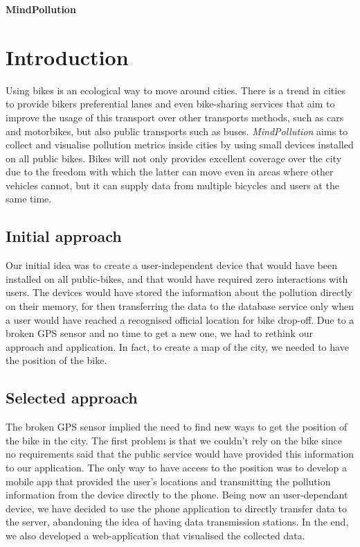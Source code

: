 \documentclass[12pt]{article}
\begin{document}
  \begin{center}
    \LARGE{\textbf{MindPollution}}
  \end{center}
  \section{Introduction}
  Using bikes is an ecological way to move around cities. 
  There is a trend in cities to provide bikers preferential lanes and even bike-sharing services that aim to improve the usage of this transport over other transports methods, such as cars and motorbikes, but also public transports such as buses. 
  \emph{MindPollution} aims to collect and visualise pollution metrics inside cities by using small devices installed on all public bikes. Bikes will not only provides excellent coverage over the city due to the freedom with which the latter can move even in areas where other vehicles cannot, but it can supply data from multiple bicycles and users at the same time.

  \subsection{Initial approach}
  Our initial idea was to create a user-independent device that would have been installed on all public-bikes, and that would have required zero interactions with users. The devices would have stored the information about the pollution directly on their memory, for then transferring the data to the database service only when a user would have reached a recognised official location for bike drop-off. Due to a broken GPS sensor and no time to get a new one, we had to rethink our approach and application. In fact, to create a map of the city, we needed to have the position of the bike.
  \subsection{Selected approach}
The broken GPS sensor implied the need to find new ways to get the position of the bike in the city. The first problem is that we couldn't rely on the bike since no requirements said that the public service would have provided this information to our application. The only way to have access to the position was to develop a mobile app that provided the user's locations and transmitting the pollution information from the device directly to the phone. Being now an user-dependant device, we have decided to use the phone application to directly transfer data to the server, abandoning the idea of having data transmission stations. In the end, we also developed a web-application that visualised the collected data.
  \newpage
\end{document}
